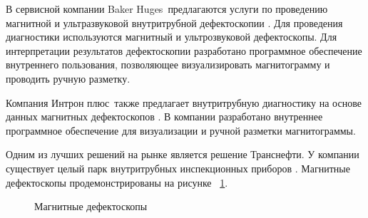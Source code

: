 \documentclass[a4paper,article,14pt]{extarticle}
\begin{document}
В сервисной компании \flqq Baker Huges\frqq\, предлагаются услуги по проведению магнитной и ультразвуковой внутритрубной дефектоскопии \cite{s2}.
Для проведения диагностики используются магнитный и ультрозвуковой дефектоскопы. Для интерпретации результатов дефектоскопии 
разработано программное обеспечение внутреннего пользования, позволяющее визуализировать магнитограмму и проводить ручную разметку.

Компания \flqq Интрон плюс\frqq\, также предлагает внутритрубную диагностику на основе данных магнитных дефектоскопов \cite{s3}. 
В компании разработано внутреннее программное обеспечение для визуализации и ручной разметки магнитограммы. 

Одним из лучших решений на рынке является решение \flqq Транснефти\frqq. У компании существует целый парк внутритрубных инспекционных 
приборов \cite{s4}. 
Магнитные дефектоскопы продемонстрированы на рисунке ~\ref{image2}.

\begin{figure}[ht]
    \begin{center}
    
    \caption{
    \label{image2}
    Магнитные дефектоскопы}
    \end {center}
\end {figure}
\end{document}
